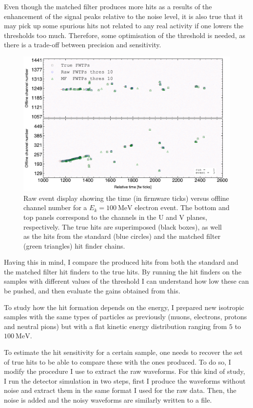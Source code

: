 Even though the matched filter produces more hits as a results of the enhancement of the signal peaks relative to the noise level, it is also true that it may pick up some spurious hits not related to any real activity if one lowers the thresholds too much. Therefore, some optimisation of the threshold is needed, as there is a trade-off between precision and sensitivity.

\begin{figure}
	\centering
	\includegraphics[width=0.9\linewidth]{Images/Matched_Filter/electron_k100_full_run_1_evt_3}
	\caption[Raw event display for an electron event showing the true, standard, and matched filter hits produced.]{Raw event display showing the time (in firmware ticks) versus offline channel number for a $E_{k} = 100 \ \mathrm{MeV}$ electron event. The bottom and top panels correspond to the channels in the U and V planes, respectively. The true hits are superimposed (black boxes), as well as the hits from the standard (blue circles) and the matched filter (green triangles) hit finder chains.}
	\label{fig:evthitcomp}
\end{figure}

Having this in mind, I compare the produced hits from both the standard  and the matched filter hit finders to the true hits. By running the hit finders on the samples with different values of the threshold I can understand how low these can be pushed, and then evaluate the gains obtained from this.

To study how the hit formation depends on the energy, I prepared new isotropic samples with the same types of particles as previously (muons, electrons, protons and neutral pions) but with a flat kinetic energy distribution ranging from $5$ to $100 \ \mathrm{MeV}$.

To estimate the hit sensitivity for a certain sample, one needs to recover the set of true hits to be able to compare these with the ones produced. To do so, I modify the procedure I use to extract the raw waveforms. For this kind of study, I run the detector simulation in two steps, first I produce the waveforms without noise and extract them in the same format I used for the raw data. Then, the noise is added and the noisy waveforms are similarly written to a file.

